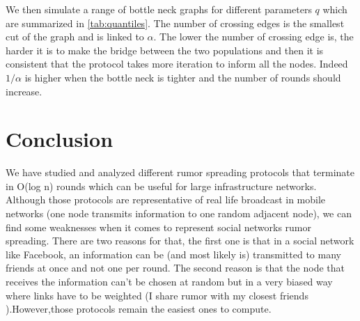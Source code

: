 \documentclass[10pt,journal,a4paper]{IEEEtran}
\begin{document}
We then simulate a range of bottle neck graphs for different parameters $q$ which are summarized in \cref{tab:quantiles}. The number of crossing edges is the smallest cut of the graph and is linked to $\alpha$. The lower the number of crossing edge is, the harder it is to make the bridge between the two populations and then it is consistent that the protocol takes more iteration to inform all the nodes. Indeed $1/\alpha$ is higher when the bottle neck is tighter and the number of rounds should increase. 

\section{Conclusion}
 We have studied and analyzed different rumor spreading protocols that terminate in O(log n) rounds which can be useful for large infrastructure networks. Although those protocols are representative of real life broadcast in mobile networks (one node transmits information to one random adjacent node), we can find some weaknesses when it comes to represent social networks rumor spreading. There are two reasons for that, the first one is that in a social network like Facebook, an information can be (and most likely is) transmitted to many friends at once and not one per round. The second reason is that the node that receives the information can’t be chosen at random but in a very biased way where links have to be weighted (I share rumor with my closest friends ).However,those protocols remain the easiest ones to compute.
\end{document}
